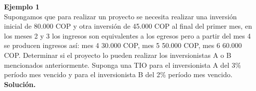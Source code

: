 
\textbf{Ejemplo 1}\\
Supongamos que para realizar un proyecto se necesita realizar una inversión inicial de 80.000 COP y otra inversión de 45.000 COP al final del primer mes, en los meses 2 y 3 los ingresos son equivalentes a los egresos pero a partir del mes 4 se producen ingresos así: mes 4 30.000 COP, mes 5 50.000 COP, mes 6 60.000 COP. Determinar si el proyecto lo pueden realizar los inversionistas A o B mencionados anteriormente. Suponga una TIO para el inversionista A del 3\% período mes vencido y para el inversionista B del 2\% período mes vencido.\\




\textbf{Solución.}\\
